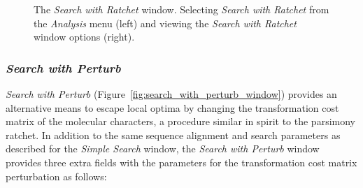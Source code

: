 {\begin{figure}
\caption{The \emph{Search with Ratchet} window. Selecting \emph{Search with Ratchet} from the \emph{Analysis} menu (left) and viewing the \emph{Search with Ratchet} window options (right).}
\label{fig:search_with_ratchet_window}
\end{figure}

\subsubsection*{\emph{Search with Perturb}}

\emph{Search with Perturb} (Figure~\ref{fig:search_with_perturb_window}) provides an alternative means to escape local optima by changing the transformation cost matrix of the molecular characters, a procedure similar in spirit to the parsimony ratchet. In addition to the same sequence alignment and search parameters as described for the \emph{Simple Search} window, the \emph{Search with Perturb} window provides three extra fields with the parameters for the
transformation cost matrix perturbation as follows:

}

